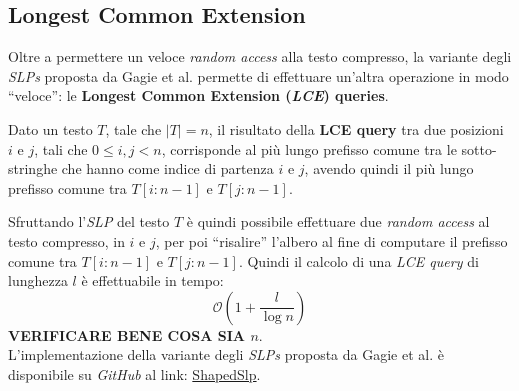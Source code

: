 \subsection{Longest Common Extension}
Oltre a permettere un veloce \textit{random access} alla testo compresso, la
variante degli \textit{SLPs} proposta da Gagie et al. permette di effettuare
un'altra operazione in modo ``veloce'': le \textbf{Longest Common Extension
  (\textit{LCE}) queries}.
\begin{definizione}
  Dato un testo $T$, tale che $|T|=n$, il risultato della \textbf{LCE query} tra
  due posizioni $i$ e $j$, tali che $0\leq i,j<n$, corrisponde al più lungo
  prefisso comune tra le sotto-stringhe che hanno come indice di partenza $i$ e
  $j$, avendo quindi il più lungo prefisso comune tra $T[i:n-1]$ e $T[j:n-1]$.
\end{definizione}
Sfruttando l'\textit{SLP} del testo $T$ è quindi possibile effettuare due
\textit{random access} al testo compresso, in $i$ e $j$, per poi ``risalire''
l'albero al fine di computare il prefisso comune tra $T[i:n-1]$ e
$T[j:n-1]$. Quindi il calcolo di una \textit{LCE query} di lunghezza $l$ è
effettuabile in tempo:
\[\mathcal{O}\left(1+\frac{l}{\log n}\right)\]
\textbf{VERIFICARE BENE COSA SIA $n$}.\\
L'implementazione della variante degli \textit{SLPs} proposta da Gagie et al. è
disponibile su \textit{GitHub} al link: 
\href{https://github.com/itomomoti/ShapedSlp}{ShapedSlp}.